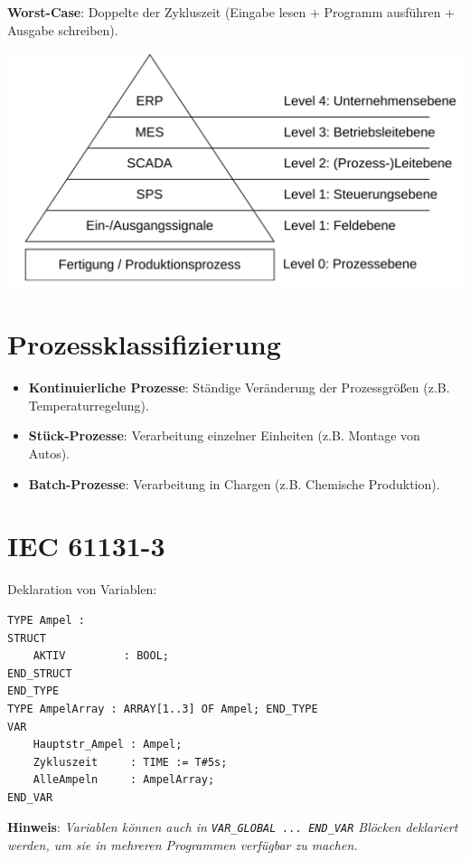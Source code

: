 \documentclass[8pt, landscape]{article}
\newcommand{\algo}[1]{\textbf{\textcolor{blue!60!black}{#1}}}
\newcommand{\datastruct}[1]{\textbf{\textcolor{red!60!black}{#1}}}
\begin{document}
\begin{multicols*}{4}
\algo{Worst-Case}: Doppelte der Zykluszeit (Eingabe lesen + Programm ausführen + Ausgabe schreiben).

\begin{center}
    \includegraphics[width=0.8\linewidth]{assets/ATP.png}
\end{center}

\section{Prozessklassifizierung}

\begin{itemize}
    \item \datastruct{Kontinuierliche Prozesse}: Ständige Veränderung der Prozessgrößen (z.B. Temperaturregelung).
    \item \datastruct{Stück-Prozesse}: Verarbeitung einzelner Einheiten (z.B. Montage von Autos).
    \item \datastruct{Batch-Prozesse}: Verarbeitung in Chargen (z.B. Chemische Produktion).
\end{itemize}

\section{IEC 61131-3}
Deklaration von Variablen:

\begin{lstlisting}[language=ST, numbers=none]
TYPE Ampel :
STRUCT
    AKTIV         : BOOL;
END_STRUCT
END_TYPE
TYPE AmpelArray : ARRAY[1..3] OF Ampel; END_TYPE
VAR
    Hauptstr_Ampel : Ampel;
    Zykluszeit     : TIME := T#5s;
    AlleAmpeln     : AmpelArray;
END_VAR
\end{lstlisting}

\algo{Hinweis}: \textit{Variablen können auch in \lstinline|VAR_GLOBAL ... END_VAR| Blöcken deklariert werden, um sie in mehreren Programmen verfügbar zu machen.}


\end{multicols*}
\end{document}
